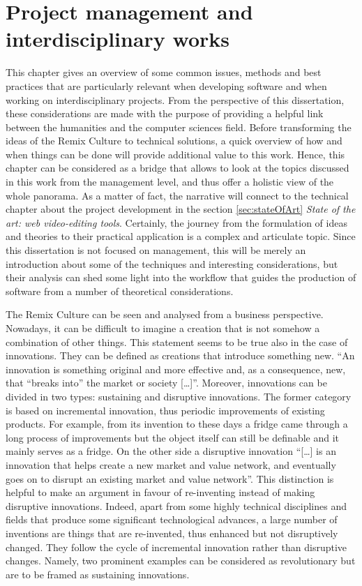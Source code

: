 \chapter{Project management and interdisciplinary works}
\label{ch:ch2_ProjectManagement}


This chapter gives an overview of some common issues, methods and best practices that are particularly relevant when developing software and when working on interdisciplinary projects. From the perspective of this dissertation, these considerations are made with the purpose of providing a helpful link between the humanities and the computer sciences field. Before transforming the ideas of the Remix Culture to technical solutions, a quick overview of how and when things can be done will provide additional value to this work. Hence, this chapter can be considered as a bridge that allows to look at the topics discussed in this work from the management level, and thus offer a holistic view of the whole panorama. As a matter of fact, the narrative will connect to the technical chapter about the project development in the section \ref{sec:stateOfArt} \emph{State of the art: web video-editing tools}.
Certainly, the journey from the formulation of ideas and theories to their practical application is a complex and articulate topic. Since this dissertation is not focused on management, this will be merely an introduction about some of the techniques and interesting considerations, but their analysis can shed some light into the workflow that guides the production of software from a number of theoretical considerations.

The Remix Culture can be seen and analysed from a business perspective. Nowadays, it can be difficult to imagine a creation that is not somehow a combination of other things. This statement seems to be true also in the case of innovations. They can be defined as creations that introduce something new. “An innovation is something original and more effective and, as a consequence, new, that “breaks into” the market or society […]”. Moreover, innovations can be divided in two types: sustaining and disruptive innovations. The former category is based on incremental innovation, thus periodic improvements of existing products. For example, from its invention to these days a fridge came through a long process of improvements but the object itself can still be definable and it mainly serves as a fridge. On the other side a disruptive innovation “[…] is an innovation that helps create a new market and value network, and eventually goes on to disrupt an existing market and value network”.
This distinction is helpful to make an argument in favour of re-inventing instead of making disruptive innovations. Indeed, apart from some highly technical disciplines and fields that produce some significant technological advances, a large number of inventions are things that are re-invented, thus enhanced but not disruptively changed. They follow the cycle of incremental innovation rather than disruptive changes. Namely, two prominent examples can be considered as revolutionary but are to be framed as sustaining innovations.

